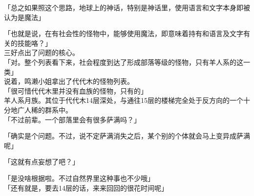 「总之如果照这个思路，地球上的神话，特别是神话里，使用语言和文字本身即被认为是魔法」

「也就是说，在有社会性的怪物中，能够使用魔法，即意味着持有和语言及文字有关的技能咯？」\\

三好点出了问题的核心。\\

「对。整个列表看下来，社会程度到达了形成部落等级的怪物，只有羊人系的这一类」\\

说着，鸣濑小姐拿出了代代木的怪物列表。\\

「很可惜代代木里并没有血族的怪物，只有的」\\

羊人系月族。其位于代代木14层深处，与通往15层的楼梯完全处于反方向的一个十分地广人稀的群系中。\\

「不过前辈。一个部落里会有很多萨满吗？」

「确实是个问题。不过，说不定萨满消失之后，某个别的个体就会马上变异成萨满呢」

「这就有点妄想了吧？」

「是没啥根据啦。不过自然界里这种事也不少哦」\\

「还有就是，要去14层的话，来来回回的很花时间呢」\\

